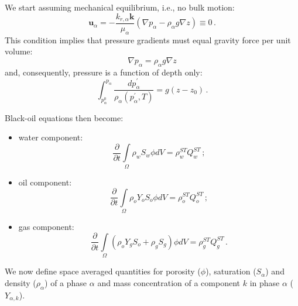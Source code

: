 \documentclass[authoryear,preprint,review,12pt]{elsarticle}
\begin{document}


We start assuming mechanical equilibrium, i.e., no bulk motion:
\begin{equation}
\mathbf{u}_\alpha = -\frac{k_{r,\alpha} \mathbf{k}}{\mu_\alpha} \left(\nabla p_\alpha - \rho_\alpha g\nabla z\right)\equiv 0 \, .
\end{equation}
This condition implies that pressure gradients must equal gravity force per unit volume:
\begin{equation}\label{eq: p=rhogh}
\nabla p_\alpha = \rho_\alpha g\nabla z
\end{equation}
and, consequently, pressure is a function of depth only:
\begin{equation}\label{eq: p=rhogh}
\int_{p_\alpha^0}^{p_\alpha} \frac{dp_\alpha^{'}}{\rho_\alpha \left(p_\alpha^{'},T\right)} = g\left(z - z_0\right) \, .
\end{equation}

Black-oil equations then become:
\begin{itemize}
\item water component:
\begin{equation}\label{eq: Sw2}
\frac{\partial}{\partial t} \int\limits_{\Omega} \rho_w S_w \phi dV = \rho_w^{ST}Q_w^{ST} \, ;
\end{equation}

\item oil component:
\begin{equation}\label{eq: So2}
\frac{\partial}{\partial t} \int\limits_{\Omega} \rho_o Y_o S_o \phi dV = \rho_o^{ST}Q_o^{ST} \, ;
\end{equation}

\item gas component:
\begin{equation}\label{eq: Sg2}
\frac{\partial}{\partial t} \int\limits_{\Omega} \left( \rho_o Y_g S_o + \rho_g S_g\right) \phi dV = \rho_g^{ST}Q_g^{ST} \, .
\end{equation}
\end{itemize}
%

We now define space averaged quantities for porosity ($\phi$), saturation ($S_\alpha$) and density ($\rho_\alpha$) of a phase $\alpha$ and mass concentration of a component $k$ in phase $\alpha$ ($Y_{\alpha,k}$).
\end{document}
